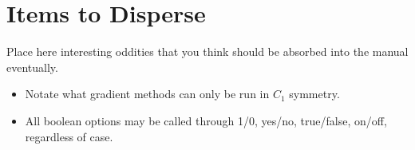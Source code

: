 \section{Items to Disperse} \label{disperse}

Place here interesting oddities that you think should be absorbed into the manual eventually.

\begin{itemize}
\item Notate what gradient methods can only be run in $C_1$ symmetry.
\item All boolean options may be called through 1/0, yes/no, true/false, on/off, regardless of case.
\end{itemize}


